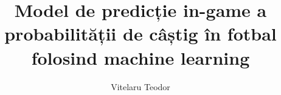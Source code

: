 \documentclass[12pt]{report}
\begin{document}
\title{Model de predicție in-game a probabilității de câștig în fotbal 
       folosind machine learning}
\author{Vitelaru Teodor}

\maketitle

\newpage
\thispagestyle{empty}
\mbox{}
\newpage
{}

\cleardoublepage



\tableofcontents

\newpage
{}









\end{document}
